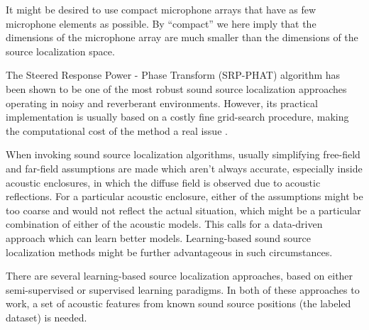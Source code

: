 \documentclass[applsci,article,submit,moreauthors,pdftex]{Definitions/mdpi}
\begin{document}
It might be desired to use compact microphone arrays that have as few microphone elements as possible. By ``compact'' we here imply that the dimensions of the microphone array are much smaller than the dimensions of the source localization space.

	

The Steered Response Power - Phase Transform (SRP-PHAT) algorithm \cite{dibiaseHighaccuracyLowlatencyTechnique2000} has been shown \cite{silvermanPerformanceRealtimeSourcelocation2005a} to be one of the most robust sound source localization approaches operating in noisy and reverberant environments. However, its practical implementation is usually based on a costly fine grid-search procedure, making the computational cost of the method a real issue \cite{martiSpeakerLocalizationDetection2011}.   

When invoking sound source localization algorithms, usually simplifying free-field and far-field assumptions are made which aren't always accurate, especially inside acoustic enclosures, in which the diffuse field is observed due to acoustic reflections. 
For a particular acoustic enclosure, either of the assumptions might be too coarse and would not reflect the actual situation, which might be a particular combination of either of the acoustic models.
This calls for a data-driven approach which can learn better models.
Learning-based sound source localization methods might be further advantageous in such circumstances. 

There are several learning-based source localization approaches, based on either semi-supervised \cite{laufer-goldshteinSemiSupervisedSoundSource2016} or supervised \cite{heDeepNeuralNetworks2018b,heAdaptationMultipleSound2019,adavanneDirectionArrivalEstimation2017} learning paradigms. In both of these approaches to work, a set of acoustic features from known sound source positions (the labeled dataset) is needed. 
\end{document}
